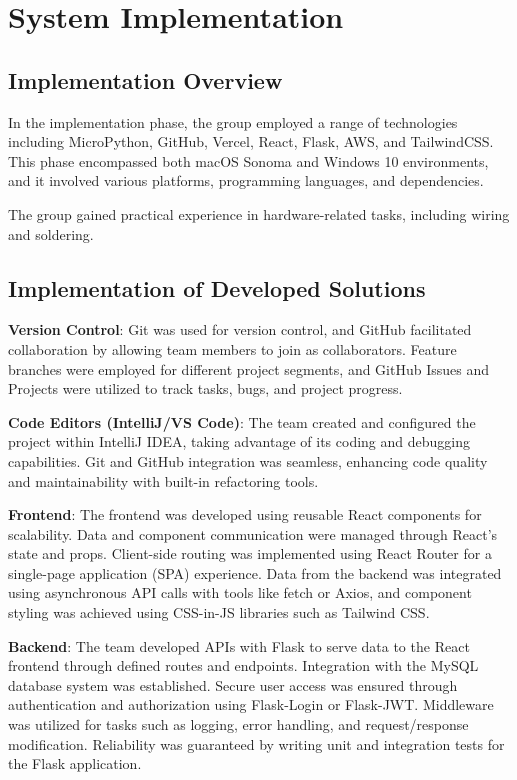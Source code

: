 \section{System Implementation}\label{sec:system-implementation}

\subsection{Implementation Overview}\label{subsec:implementation-overview}
In the implementation phase, the group employed a range of technologies including MicroPython, GitHub, Vercel, React, Flask, AWS, and TailwindCSS. This phase encompassed
both macOS Sonoma and Windows 10 environments, and it involved various platforms,
programming languages, and dependencies. %

The group gained practical experience in hardware-related tasks, including wiring and
soldering. %

\subsection{Implementation of Developed Solutions}\label{subsec:implementation-of-developed-solutions}

\textbf{Version Control}: Git was used for version control, and GitHub facilitated
collaboration by allowing team members to join as collaborators. %
Feature branches were employed for different project segments, and GitHub Issues and Projects were
utilized to track tasks, bugs, and project progress. %

\textbf{Code Editors (IntelliJ/VS Code)}: The team created and configured the project
within IntelliJ IDEA, taking advantage of its coding and debugging capabilities.
Git and GitHub integration was seamless, enhancing code quality and maintainability
with built-in refactoring tools. %

\textbf{Frontend}: The frontend was developed using reusable React components for scalability. %
Data and component communication were managed through React's state and props. %
Client-side routing was implemented using React Router for a single-page application (SPA) experience. %
Data from the backend was integrated using asynchronous API calls with tools like fetch or
Axios, and component styling was achieved using CSS-in-JS libraries such as Tailwind CSS\@. %

\textbf{Backend}: The team developed APIs with Flask to serve data to the React frontend
through defined routes and endpoints. %
Integration with the MySQL database system was established. %
Secure user access was ensured through authentication and authorization using Flask-Login or Flask-JWT. %
Middleware was utilized for tasks such as logging, error handling, and request/response modification. %
Reliability was guaranteed by writing unit and integration tests for the Flask application. %

